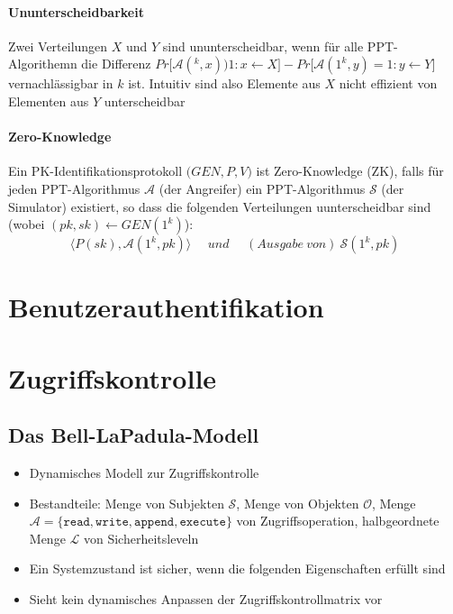 \paragraph{Ununterscheidbarkeit} Zwei Verteilungen \(X\) und \(Y\) sind ununterscheidbar, wenn für alle PPT-Algorithemn die Differenz \(Pr\big\lbrack\mathcal{A}(^k,x) ) 1 : x\leftarrow X\big\rbrack - Pr\big\lbrack\mathcal{A}(1^k,y) = 1 : y\leftarrow Y\big\rbrack\) vernachlässigbar in \(k\) ist. Intuitiv sind also Elemente aus \(X\) nicht effizient von Elementen aus \(Y\) unterscheidbar

\paragraph{Zero-Knowledge} Ein PK-Identifikationsprotokoll \(\big(GEN,P,V\big)\) ist Zero-Knowledge (ZK), falls für jeden PPT-Algorithmus \(\mathcal{A}\) (der Angreifer) ein PPT-Algorithmus \(\mathcal{S}\) (der Simulator) existiert, so dass die folgenden Verteilungen uunterscheidbar sind (wobei \((pk,sk) \leftarrow GEN(1^k)\)):
\[\langle P(sk),\mathcal{A}(1^k,pk)\rangle~~~~~~und~~~~~~(Ausgabe~von)~\mathcal{S}(1^k,pk)\]



\section{Benutzerauthentifikation}



\section{Zugriffskontrolle}

\subsection{Das Bell-LaPadula-Modell}
\begin{itemize}
	\item Dynamisches Modell zur Zugriffskontrolle
	\item Bestandteile: Menge von Subjekten \(\mathcal{S}\), Menge von Objekten \(\mathcal{O}\), Menge \(\mathcal{A} = \{\texttt{read},\texttt{write},\texttt{append},\texttt{execute}\}\) von Zugriffsoperation, halbgeordnete Menge \(\mathcal{L}\) von Sicherheitsleveln
	\item Ein Systemzustand ist sicher, wenn die folgenden Eigenschaften erfüllt sind
	\item Sieht kein dynamisches Anpassen der Zugriffskontrollmatrix vor
\end{itemize}

